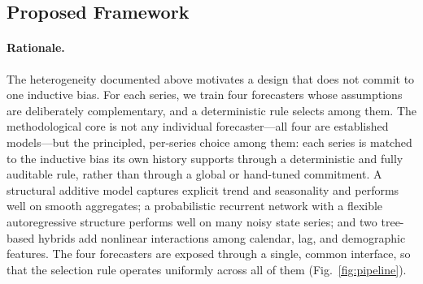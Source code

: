 \documentclass[runningheads]{llncs}
\begin{document}
\subsection{Proposed Framework}
\label{ssec:framework}

\paragraph{Rationale.}
The heterogeneity documented above motivates a design that does not
commit to one inductive bias. For each series, we train four
forecasters whose assumptions are deliberately complementary, and a
deterministic rule selects among them. The methodological core
is not any individual forecaster---all four are established models---but
the principled, per-series choice among them: each series is matched to
the inductive bias its own history supports through a deterministic and
fully auditable rule, rather than through a global or hand-tuned
commitment. A structural additive model captures explicit trend and
seasonality and performs well on smooth aggregates; a probabilistic
recurrent network with a flexible autoregressive structure performs
well on many noisy state series; and two tree-based hybrids add
nonlinear interactions among calendar, lag, and demographic features. The four forecasters are
exposed through a single, common interface, so that the selection rule
operates uniformly across all of them (Fig.~\ref{fig:pipeline}).
\end{document}
